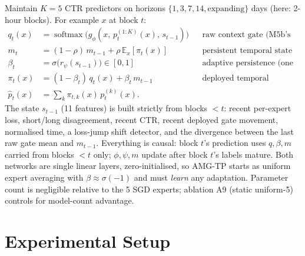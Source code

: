 \documentclass[11pt]{article}
\begin{document}
Maintain $K=5$ CTR predictors on horizons $\{1,3,7,14,\text{expanding}\}$ days
(here: 2-hour blocks). For example $x$ at block $t$:
\begin{align}
q_t(x)   &= \operatorname{softmax}\!\big(g_\phi(x,\, p^{(1:K)}_t(x),\, s_{t-1})\big)
           && \text{raw context gate (M5b's gate)}\\
m_t      &= (1-\rho)\,m_{t-1} + \rho\, \mathbb{E}_x[\pi_t(x)]
           && \text{persistent temporal state}\\
\beta_t  &= \sigma\!\big(r_\psi(s_{t-1})\big) \in [0,1]
           && \text{adaptive persistence (one global scalar / block)}\\
\pi_t(x) &= (1-\beta_t)\, q_t(x) + \beta_t\, m_{t-1}
           && \text{deployed temporal mixture}\\
\hat p_t(x) &= \textstyle\sum_{k} \pi_{t,k}(x)\, p^{(k)}_t(x).
\end{align}
The state $s_{t-1}$ (11 features) is built strictly from blocks $<t$: recent
per-expert loss, short/long disagreement, recent CTR, recent deployed gate
movement, normalised time, a loss-jump shift detector, and the divergence
between the last raw gate mean and $m_{t-1}$. Everything is causal: block $t$'s
prediction uses $q,\beta,m$ carried from blocks $<t$ only; $\phi,\psi,m$ update
after block $t$'s labels mature. Both networks are single linear layers,
zero-initialised, so AMG-TP starts as uniform expert averaging with
$\beta \approx \sigma(-1)$ and must \emph{learn} any adaptation. Parameter count
is negligible relative to the 5 SGD experts; ablation A9 (static uniform-5)
controls for model-count advantage.

\section{Experimental Setup}
\end{document}
